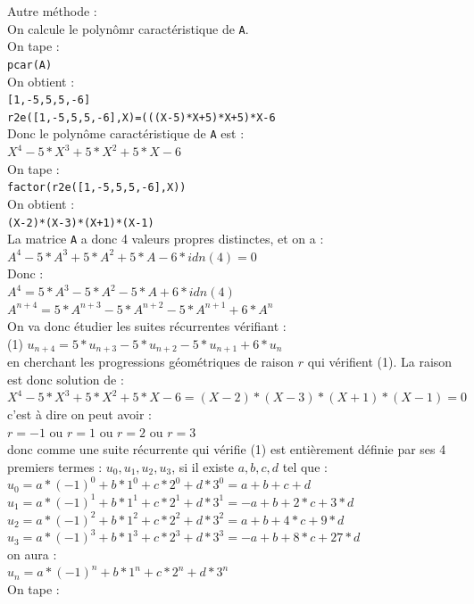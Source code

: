 \documentclass[a4paper,11pt]{book}
\begin{document}
Autre m\'ethode :\\
On calcule le polyn\^omr caract\'eristique de {\tt A}.\\
On tape :\\
{\tt pcar(A)}\\
On obtient :\\
{\tt [1,-5,5,5,-6]}\\
{\tt r2e([1,-5,5,5,-6],X)=(((X-5)*X+5)*X+5)*X-6}\\
Donc le polyn\^ome caract\'eristique de {\tt A} est :\\
$X^4-5*X^3+5*X^2+5*X-6$\\
On tape :\\
{\tt factor(r2e([1,-5,5,5,-6],X))}\\
On obtient :\\
{\tt (X-2)*(X-3)*(X+1)*(X-1)}\\
La matrice {\tt A} a donc 4 valeurs propres distinctes, et on a :\\
$A^4-5*A^3+5*A^2+5*A-6*idn(4)=0$\\
Donc :\\
$A^4=5*A^3-5*A^2-5*A+6*idn(4)$\\
$A^{n+4}=5*A^{n+3}-5*A^{n+2}-5*A^{n+1}+6*A^n$\\
On va donc \'etudier les suites r\'ecurrentes v\'erifiant :\\
(1) $u_{n+4}=5*u_{n+3}-5*u_{n+2}-5*u_{n+1}+6*u_n$\\
en cherchant les progressions g\'eom\'etriques de raison $r$ 
qui v\'erifient (1). La raison est donc solution de :\\
$X^4-5*X^3+5*X^2+5*X-6=(X-2)*(X-3)*(X+1)*(X-1)=0$ \\
c'est \`a dire on peut avoir :\\
$r=-1$ ou $r=1$ ou $r=2$ ou $r=3$\\
donc comme une suite r\'ecurrente qui v\'erifie (1) est enti\`erement d\'efinie
par ses 4 premiers termes : $u_0,u_1,u_2,u_3$, si il existe $a,b,c,d$ 
tel que :\\
$u_0=a*(-1)^0+b*1^0+c*2^0+d*3^0=a+b+c+d$\\
$u_1=a*(-1)^1+b*1^1+c*2^1+d*3^1=-a+b+2*c+3*d$\\
$u_2=a*(-1)^2+b*1^2+c*2^2+d*3^2=a+b+4*c+9*d$\\
$u_3=a*(-1)^3+b*1^3+c*2^3+d*3^3=-a+b+8*c+27*d$\\
on aura :\\
$u_n=a*(-1)^n+b*1^n+c*2^n+d*3^n$\\
On tape :\\
\end{document}
